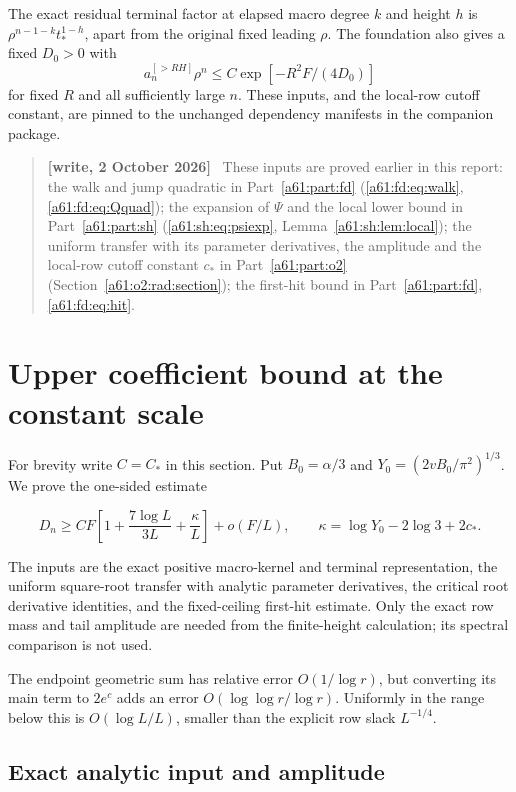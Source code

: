 \documentclass[11pt,letterpaper]{article}
\numberwithin{equation}{section}
\theoremstyle{remark}\newtheorem{remark}[theorem]{Remark}
\newenvironment{writenote}{\par\smallskip\begin{quote}\small\textbf{[write, 2 October 2026]}\ }{\end{quote}\smallskip}
\begin{document}
The exact residual terminal factor at elapsed macro degree $k$ and
height $h$ is $\rho^{n-1-k}t_*^{1-h}$, apart from the original fixed
leading $\rho$. The foundation also gives a fixed $D_0>0$ with
\[
 a_n^{[>RH]}\rho^n\le C\exp[-R^2F/(4D_0)]
\]
for fixed $R$ and all sufficiently large $n$.
These inputs, and the local-row cutoff constant, are pinned to the
unchanged dependency manifests in the companion package.
\begin{writenote}
These inputs are proved earlier in this report: the walk and jump quadratic in Part~\ref{a61:part:fd} (\eqref{a61:fd:eq:walk}, \eqref{a61:fd:eq:Qquad}); the expansion of $\Psi$ and the local lower bound in Part~\ref{a61:part:sh} (\eqref{a61:sh:eq:psiexp}, Lemma~\ref{a61:sh:lem:local}); the uniform transfer with its parameter derivatives, the amplitude and the local-row cutoff constant $c_*$ in Part~\ref{a61:part:o2} (Section~\ref{a61:o2:rad:section}); the first-hit bound in Part~\ref{a61:part:fd}, \eqref{a61:fd:eq:hit}.
\end{writenote}


\section{Upper coefficient bound at the constant scale}\label{a61:o3:up3:section}

For brevity write \(C=C_*\) in this section. Put \(B_0=\alpha/3\) and
\(Y_0=(2vB_0/\pi^2)^{1/3}\). We prove the one-sided estimate

\begin{equation}
D_n\ge CF\left[1+\frac{7\log L}{3L}+\frac\kappa L\right]+o(F/L),
\qquad \kappa=\log Y_0-2\log3+2c_*.
\label{a61:o3:up3:target}
\end{equation}

The inputs are the exact positive macro-kernel and terminal
representation, the uniform square-root transfer with analytic parameter
derivatives, the critical root derivative identities, and the
fixed-ceiling first-hit estimate. Only the exact row mass and tail
amplitude are needed from the finite-height calculation; its spectral
comparison is not used.

The endpoint geometric sum has relative error \(O(1/\log r)\), but
converting its main term to \(2e^c\) adds an error
\(O(\log\log r/\log r)\). Uniformly in the range below this is
\(O(\log L/L)\), smaller than the explicit row slack \(L^{-1/4}\).

\subsection{Exact analytic input and amplitude}
\end{document}
